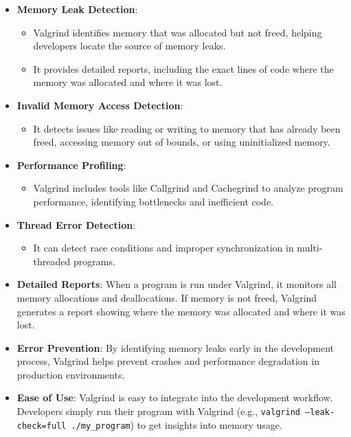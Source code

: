 \documentclass{article}
\newcounter{subsubsubsection}[subsubsection]
\begin{document}
\begin{itemize}
  \item \textbf{Memory Leak Detection}:
    \begin{itemize}
      \item Valgrind identifies memory that was allocated but not freed, helping developers locate the source of memory leaks.
      \item It provides detailed reports, including the exact lines of code where the memory was allocated and where it was lost.
    \end{itemize}
  \item \textbf{Invalid Memory Access Detection}:
    \begin{itemize}
      \item It detects issues like reading or writing to memory that has already been freed, accessing memory out of bounds, or using uninitialized memory.
    \end{itemize}
  \item \textbf{Performance Profiling}:
    \begin{itemize}
      \item Valgrind includes tools like Callgrind and Cachegrind to analyze program performance, identifying bottlenecks and inefficient code.
    \end{itemize}
  \item \textbf{Thread Error Detection}:
    \begin{itemize}
      \item It can detect race conditions and improper synchronization in multi-threaded programs.
    \end{itemize}
\end{itemize}

\begin{itemize}
  \item \textbf{Detailed Reports}: When a program is run under Valgrind, it monitors all memory allocations and deallocations. If memory is not freed, Valgrind generates a report showing where the memory was allocated and where it was lost.
  \item \textbf{Error Prevention}: By identifying memory leaks early in the development process, Valgrind helps prevent crashes and performance degradation in production environments.
  \item \textbf{Ease of Use}: Valgrind is easy to integrate into the development workflow. Developers simply run their program with Valgrind (e.g., \texttt{valgrind --leak-check=full ./my\_program}) to get insights into memory usage.
\end{itemize}
\end{document}
